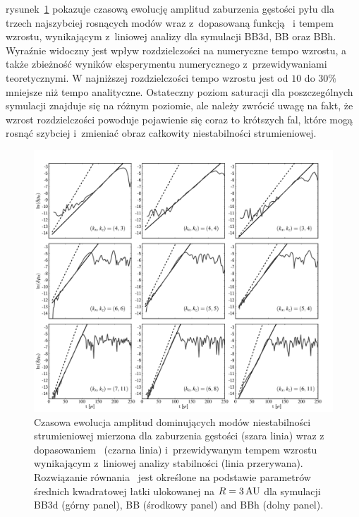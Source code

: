 \par rysunek~\ref{fig8} pokazuje czasową ewolucję amplitud zaburzenia gęstości
pyłu dla trzech najszybciej rosnących modów wraz z~dopasowaną funkcją~
i tempem wzrostu, wynikającym z~liniowej analizy dla symulacji BB3d, BB oraz BBh.
Wyraźnie widoczny jest wpływ rozdzielczości na numeryczne tempo wzrostu, a także
zbieżność wyników eksperymentu numerycznego z~przewidywaniami teoretycznymi. W
najniższej rozdzielczości tempo wzrostu jest od $10$ do $30\%$ mniejsze niż tempo
analityczne. Ostateczny poziom saturacji dla poszczególnych symulacji znajduje
się na różnym poziomie, ale należy zwrócić uwagę na fakt, że wzrost
rozdzielczości powoduje pojawienie się coraz to krótszych fal, które mogą rosnąć
szybciej i~zmieniać obraz całkowity niestabilności strumieniowej.
 
\begin{figure} \includegraphics[width=0.98\linewidth]{figures/fig8}
   \caption[Ewolucja dominujących modów niestabilności strumieniowej.]
     {Czasowa ewolucja amplitud dominujących modów niestabilności
      strumieniowej mierzona dla zaburzenia gęstości (szara linia) wraz z
      dopasowaniem~ (czarna linia) i~przewidywanym tempem wzrostu
      wynikającym z~liniowej analizy stabilności (linia przerywana).
      Rozwiązanie równania~ jest określone na podstawie
      parametrów średnich kwadratowej łatki ulokowanej na $R=3\hbox{$\thinspace\textrm{AU}$}$ dla symulacji
BB3d (górny panel), BB (środkowy panel) and BBh (dolny panel).  } \label{fig8}
\end{figure}

